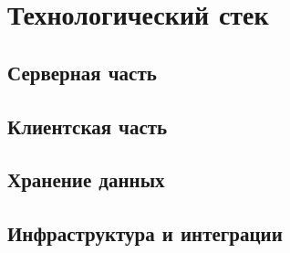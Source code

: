 \section{Технологический стек}

\subsection{Серверная часть}

\subsection{Клиентская часть}

\subsection{Хранение данных}

\subsection{Инфраструктура и интеграции}